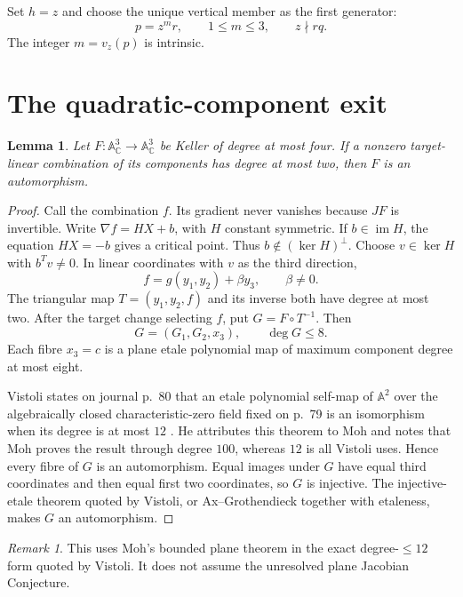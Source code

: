 \documentclass[11pt]{article}
\newtheorem{lemma}[theorem]{Lemma}
\theoremstyle{remark}
\newtheorem{remark}[theorem]{Remark}
\newcommand{\A}{\mathbb A}
\newcommand{\C}{\mathbb C}
\begin{document}
Set $h=z$ and choose the unique vertical member as the first generator:
\begin{equation}
 p=z^m r,\qquad 1\le m\le3,\qquad z\nmid rq.          \label{eq:vertical}
\end{equation}
The integer $m=v_z(p)$ is intrinsic.

\section{The quadratic-component exit}

\begin{lemma}\label{lem:quadratic}
Let $F:\A^3_\C\to\A^3_\C$ be Keller of degree at most four.  If a
nonzero target-linear combination of its components has degree at most two,
then $F$ is an automorphism.
\end{lemma}

\begin{proof}
Call the combination $f$.  Its gradient never vanishes because $JF$ is
invertible.  Write $\nabla f=HX+b$, with $H$ constant symmetric.  If
$b\in\operatorname{im}H$, the equation $HX=-b$ gives a critical point.
Thus $b\notin(\ker H)^\perp$.  Choose $v\in\ker H$ with $b^Tv\ne0$.
In linear coordinates with $v$ as the third direction,
\[
 f=g(y_1,y_2)+\beta y_3,\qquad\beta\ne0.
\]
The triangular map $T=(y_1,y_2,f)$ and its inverse both have degree at
most two.  After the target change selecting $f$, put $G=F\circ T^{-1}$.
Then
\[
 G=(G_1,G_2,x_3),\qquad \deg G\le8.
\]
Each fibre $x_3=c$ is a plane etale polynomial map of maximum component
degree at most eight.

Vistoli states on journal p.~80 that an etale polynomial self-map of
$\A^2$ over the algebraically closed characteristic-zero field fixed on
p.~79 is an isomorphism when its degree is at most $12$
\cite[p.~80]{Vistoli}.  He attributes this theorem to Moh and notes that
Moh proves the result through degree $100$, whereas $12$ is all Vistoli
uses.  Hence every fibre of $G$ is an automorphism.  Equal images under
$G$ have equal third coordinates and then equal first two coordinates, so
$G$ is injective.  The injective-etale theorem quoted by Vistoli, or
Ax--Grothendieck together with etaleness, makes $G$ an automorphism.
\end{proof}

\begin{remark}
This uses Moh's bounded plane theorem in the exact degree-$\le12$ form
quoted by Vistoli.  It does not assume the unresolved plane Jacobian
Conjecture.
\end{remark}
\end{document}
